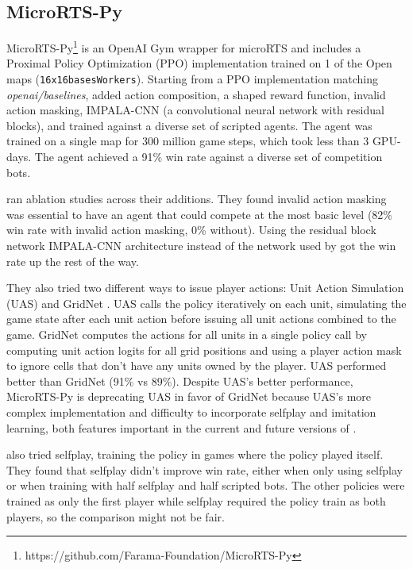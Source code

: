\documentclass{article}
\begin{document}
\subsection{MicroRTS-Py}
MicroRTS-Py\footnote{https://github.com/Farama-Foundation/MicroRTS-Py} is an OpenAI Gym
wrapper for microRTS and includes a Proximal Policy Optimization (PPO) implementation
trained on 1 of the Open maps (\texttt{16x16basesWorkers}). Starting from a PPO
implementation matching \textit{openai/baselines},
\citet{DBLP:journals/corr/abs-2105-13807} added action composition, a shaped reward function, invalid action
masking, IMPALA-CNN (a convolutional neural network with residual blocks), and trained
against a diverse set of scripted agents. The agent was trained on a single map for 300
million game steps, which took less than 3 GPU-days. The agent achieved a
91\% win rate against a diverse set of competition bots.

\citet{DBLP:journals/corr/abs-2105-13807} ran ablation studies across their additions.
They found invalid action masking was essential to have an agent that could compete at
the most basic level (82\% win rate with invalid action masking, 0\% without). Using the
residual block network IMPALA-CNN architecture instead of the network used by
\citet{DBLP:journals/corr/MnihKSGAWR13} got the win rate up the rest of the way.

They also tried two different ways to issue player actions: Unit Action Simulation (UAS)
and GridNet \citep{pmlr-v97-han19a}. UAS calls the policy iteratively on each unit, simulating the game state
after each unit action before issuing all unit actions combined to the game. GridNet
computes the actions for all units in a single policy call by computing unit action
logits for all grid positions and using a player action mask to ignore cells that don't
have any units owned by the player. UAS performed better than GridNet (91\% vs 89\%).
Despite UAS's better performance, MicroRTS-Py is deprecating UAS in favor of GridNet
because UAS's more complex implementation and difficulty to incorporate selfplay and
imitation learning, both features important in the current and future versions of
\agentName.

\citet{DBLP:journals/corr/abs-2105-13807} also tried selfplay, training the policy in
games where the policy played itself. They found that selfplay didn't improve win rate,
either when only using selfplay or when training with half selfplay and half scripted
bots. The other policies were trained as only the first player while selfplay required
the policy train as both players, so the comparison might not be fair.
\end{document}
